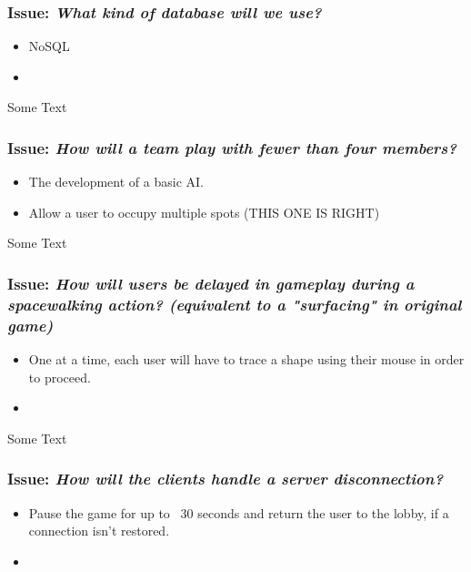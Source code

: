 \subsubsection*{Issue: \textit{What kind of database will we use?}}

  \begin{itemize}
    \item NoSQL
    \item 
  \end{itemize}

Some Text

\subsubsection*{Issue: \textit{How will a team play with fewer than four members?}}

  \begin{itemize}
    \item The development of a basic AI.
    \item Allow a user to occupy multiple spots (THIS ONE IS RIGHT)
  \end{itemize}

Some Text

\subsubsection*{Issue: \textit{How will users be delayed in gameplay during a spacewalking action? (equivalent to a "surfacing" in original game)}}

  \begin{itemize}
    \item One at a time, each user will have to trace a shape using their mouse in order to proceed.
    \item 
  \end{itemize}

Some Text

\subsubsection*{Issue: \textit{How will the clients handle a server disconnection?}}

  \begin{itemize}
    \item Pause the game for up to ~30 seconds and return the user to the lobby, if a connection isn't restored.
    \item 
  \end{itemize}

